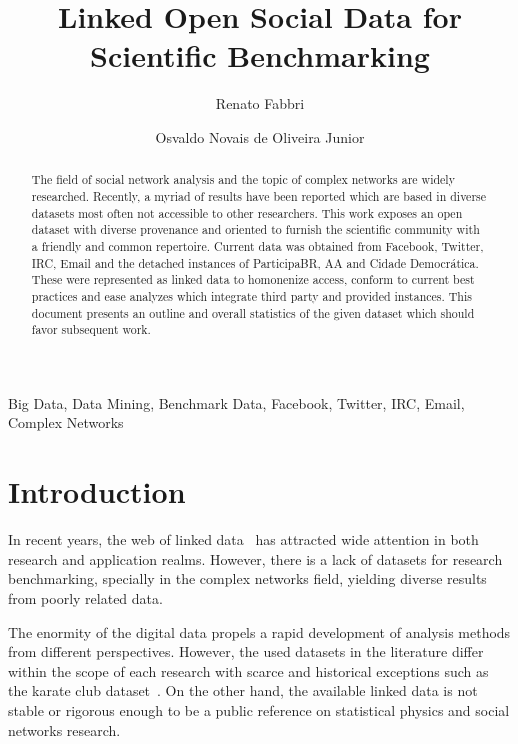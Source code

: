 \documentclass[review]{elsarticle}
\begin{document}
%
\begin{frontmatter}
%
\title{Linked Open Social Data for Scientific Benchmarking}
%
\author[pwr]{Renato Fabbri}
%
\author[pwr]{Osvaldo Novais de Oliveira Junior}
%
\address[pwr]{S\~ao Carlos Institute of Physics, S\~ao Paulo
University, Brazil}
%
%
\begin{abstract}
The field of social network analysis and the topic of complex networks
are widely researched.
Recently, a myriad of results have been reported which are based in
diverse datasets most often not accessible to other researchers.
This work exposes an open dataset with diverse provenance and oriented
to furnish the scientific community with a friendly and common repertoire.
Current data was obtained from Facebook, Twitter, IRC, Email and the
detached instances of ParticipaBR, AA and Cidade Democr\'atica.
These were represented as linked data to homonenize access,
conform to current best practices and ease analyzes which integrate third
party and provided instances.
This document presents an outline and overall statistics of the given
dataset which should favor subsequent work.
\end{abstract}
%
\begin{keyword}
Big Data, Data Mining, Benchmark Data, Facebook, Twitter, IRC, Email, Complex Networks
\end{keyword}

\end{frontmatter}

\section{Introduction}
In recent years, the web of linked data~\cite{lee1} has attracted wide attention in
both research and application realms.
However, there is a lack of datasets for research benchmarking,
specially in the complex networks field, yielding diverse results from 
poorly related data.

The enormity of the digital data propels a rapid development of analysis methods
from different perspectives.
However, the used datasets in the literature differ within the scope of each research with
scarce and historical exceptions such as the
karate club dataset~\cite{newmanBook}.
On the other hand, the available linked data is not 
stable or rigorous enough to be
a public reference on statistical physics and social networks research.
 
\end{document}

